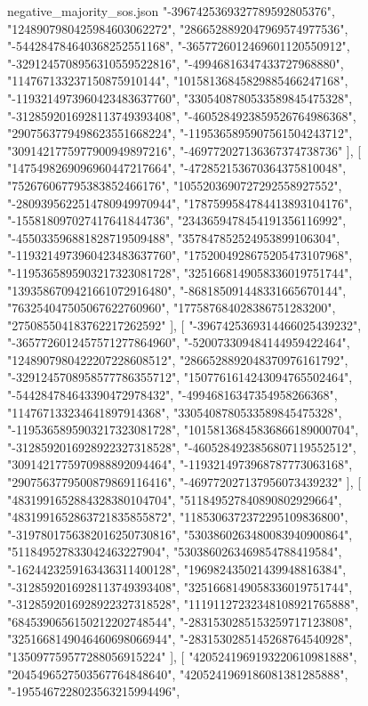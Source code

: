 \begin{filecontents*}[overwrite]{negative_majority_sos.json}
    "-3967425369327789592805376",
    "1248907980425984603062272",
    "2866528892047969574977536",
    "-544284784640368252551168",
    "-3657726012469601120550912",
    "-3291245708956310559522816",
    "-49946816347433727968880",
    "114767133237150875910144",
    "10158136845829885466247168",
    "-1193214973960423483637760",
    "3305408780533589845475328",
    "-3128592016928113749393408",
    "-4605284923859526764986368",
    "2907563779498623551668224",
    "-1195365895907561504243712",
    "3091421775977900949897216",
    "-469772027136367374738736"
   ],
   [
    "1475498269096960447217664",
    "-472852153670364375810048",
    "752676067795383852466176",
    "1055203690727292558927552",
    "-2809395622514780949970944",
    "1787599584784413893104176",
    "-155818097027417641844736",
    "2343659478454191356116992",
    "-455033596881828719509488",
    "357847852524953899106304",
    "-1193214973960423483637760",
    "1752004928675205473107968",
    "-1195365895903217323081728",
    "3251668149058336019751744",
    "1393586709421661072916480",
    "-868185091448331665670144",
    "763254047505067622760960",
    "177587684028386751283200",
    "275085504183762217262592"
   ],
   [
    "-3967425369314466025439232",
    "-3657726012457571277864960",
    "-520073309484144959422464",
    "1248907980422207228608512",
    "2866528892048370976161792",
    "-3291245708958577786355712",
    "1507761614243094765502464",
    "-544284784643390472978432",
    "-49946816347354958266368",
    "114767133234641897914368",
    "3305408780533589845475328",
    "-1195365895903217323081728",
    "10158136845836866189000704",
    "-3128592016928922327318528",
    "-4605284923856807119552512",
    "3091421775970988892094464",
    "-1193214973968787773063168",
    "2907563779500879869116416",
    "-469772027137956073439232"
   ],
   [
    "4831991652884328380104704",
    "511849527840890802929664",
    "4831991652863721835855872",
    "1185306372372295109836800",
    "-3197801756382016250730816",
    "5303860263480083940900864",
    "511849527833042463227904",
    "5303860263469854788419584",
    "-1624423259163436311400128",
    "196982435021439948816384",
    "-3128592016928113749393408",
    "3251668149058336019751744",
    "-3128592016928922327318528",
    "11191127232348108921765888",
    "6845390656150212202748544",
    "-2831530285153259717123808",
    "3251668149046460698066944",
    "-2831530285145268764540928",
    "135097759577288056915224"
   ],
   [
    "4205241969193220610981888",
    "2045496527503567764848640",
    "4205241969186081381285888",
    "-1955467228023563215994496",

\end{filecontents*}
